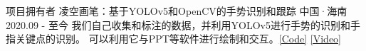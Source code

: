 \begin{cventries}


\cventry
{项目拥有者} %
{凌空画笔：基于YOLOv5和OpenCV的手势识别和跟踪} %
{中国·海南} %
{2020.09 - 至今} %
{
	我们自己收集和标注的数据，并利用YOLOv5进行手势的识别和手指关键点的识别。
	可以利用它与PPT等软件进行绘制和交互。\textcolor{awesome-red}{\href{https://github.com/beiyuouo/mid-air-draw}{[Code]}} \textcolor{awesome-red}{\href{https://www.bilibili.com/video/BV15V411a7WB/}{[Video]}}
}



\end{cventries}
